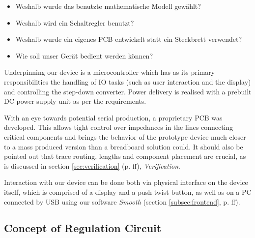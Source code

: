 \begin{itemize}
    \item
        Weshalb wurde das benutzte mathematische Modell gew\"ahlt?
    \item
        Weshalb wird ein Schaltregler benutzt?
    \item
        Weshalb wurde ein eigenes PCB entwickelt statt ein Steckbrett verwendet?
    \item
        Wie soll unser Ger\"at bedient werden k\"onnen?
\end{itemize}

Underpinning  our  device  is  a  microcontroller which  has  as  its  primary
responsibilities the  handling of IO tasks  (such as user interaction  and the
display) and  controlling the step-down converter. Power  delivery is realised
with a prebuilt DC power supply unit as per the requirements.

With  an  eye towards  potential  serial  production,  a proprietary  PCB  was
developed.  This allows tight control  over impedances in the lines connecting
critical  components and  brings the  behavior  of the  prototype device  much
closer  to  a mass  produced  version  than  a breadboard  solution  could. It
should  also  be  pointed  out  that  trace  routing,  lengths  and  component
placement are crucial,  as is discussed in  section \ref{sec:verification} (p.
\pageref{sec:verification}ff), \emph{Verification}.

Interaction with  our device can  be done both  via physical interface  on the
device itself,  which is comprised  of a display  and a push-twist  button, as
well as  on a PC  connected by USB  using our software  \emph{Smooth} (section
\ref{subsec:frontend}, p. \pageref{subsec:frontend}ff).


\subsection{Concept of Regulation Circuit}

